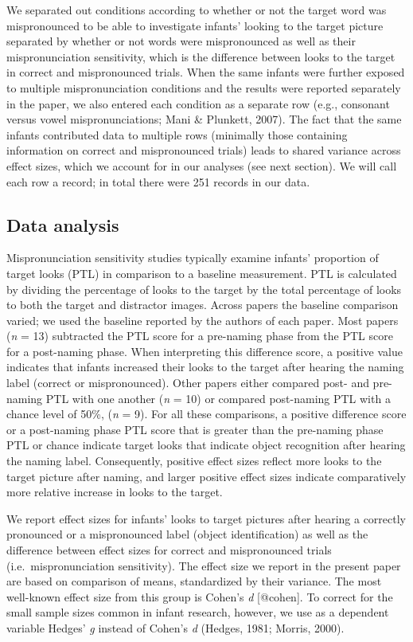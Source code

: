 \documentclass[man]{apa6}
\theoremstyle{definition}
\theoremstyle{definition}
\theoremstyle{definition}
\theoremstyle{remark}
\begin{document}
We separated out conditions according to whether or not the target word
was mispronounced to be able to investigate infants' looking to the
target picture separated by whether or not words were mispronounced as
well as their mispronunciation sensitivity, which is the difference
between looks to the target in correct and mispronounced trials. When
the same infants were further exposed to multiple mispronunciation
conditions and the results were reported separately in the paper, we
also entered each condition as a separate row (e.g., consonant versus
vowel mispronunciations; Mani \& Plunkett, 2007). The fact that the same
infants contributed data to multiple rows (minimally those containing
information on correct and mispronounced trials) leads to shared
variance across effect sizes, which we account for in our analyses (see
next section). We will call each row a record; in total there were 251
records in our data.

\subsection{Data analysis}\label{data-analysis}

Mispronunciation sensitivity studies typically examine infants'
proportion of target looks (PTL) in comparison to a baseline
measurement. PTL is calculated by dividing the percentage of looks to
the target by the total percentage of looks to both the target and
distractor images. Across papers the baseline comparison varied; we used
the baseline reported by the authors of each paper. Most papers
(\emph{n} = 13) subtracted the PTL score for a pre-naming phase from the
PTL score for a post-naming phase. When interpreting this difference
score, a positive value indicates that infants increased their looks to
the target after hearing the naming label (correct or mispronounced).
Other papers either compared post- and pre-naming PTL with one another
(\emph{n} = 10) or compared post-naming PTL with a chance level of 50\%,
(\emph{n} = 9). For all these comparisons, a positive difference score
or a post-naming phase PTL score that is greater than the pre-naming
phase PTL or chance indicate target looks that indicate object
recognition after hearing the naming label. Consequently, positive
effect sizes reflect more looks to the target picture after naming, and
larger positive effect sizes indicate comparatively more relative
increase in looks to the target.

We report effect sizes for infants' looks to target pictures after
hearing a correctly pronounced or a mispronounced label (object
identification) as well as the difference between effect sizes for
correct and mispronounced trials (i.e.~mispronunciation sensitivity).
The effect size we report in the present paper are based on comparison
of means, standardized by their variance. The most well-known effect
size from this group is Cohen's \emph{d} {[}@cohen{]}. To correct for
the small sample sizes common in infant research, however, we use as a
dependent variable Hedges' \emph{g} instead of Cohen's \emph{d} (Hedges,
1981; Morris, 2000).
\end{document}
